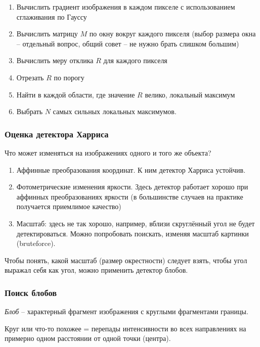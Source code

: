 \documentclass[main.tex]{subfiles}
\begin{document}
\begin{enumerate}[noitemsep]
	\item Вычислить градиент изображения в каждом пикселе с использованием сглаживания по Гауссу
	\item Вычислить матрицу $M$ по окну вокруг каждого пикселя (выбор размера окна -- отдельный вопрос, общий совет -- не нужно брать слишком большим)
	\item Вычислить меру отклика $R$ для каждого пикселя
	\item Отрезать $R$ по порогу
	\item Найти в каждой области, где значение $R$ велико, локальный максимум
	\item Выбрать $ N $ самых сильных локальных максимумов.
\end{enumerate}

\subsubsection{Оценка детектора Харриса}

Что может изменяться на изображениях одного и того же объекта?

\begin{enumerate}[noitemsep]
	\item Аффинные преобразования координат. К ним детектор Харриса устойчив.
	\item Фотометрические изменения яркости. Здесь детектор работает хорошо при аффинных преобразованиях яркости (в большинстве случаев на практике получается приемлимое качество)
	\item Масштаб: здесь не так хорошо, например, вблизи скруглённый угол не будет детектироваться.
	Можно попробовать поискать, изменяя масштаб картинки (bruteforce).
\end{enumerate}

Чтобы понять, какой масштаб (размер окрестности) следует взять, чтобы угол выражал себя как угол, можно применить детектор блобов.

\subsubsection{Поиск блобов}

\emph{Блоб} -- характерный фрагмент изображения с круглыми фрагментами границы.

Круг или что-то похожее = перепады интенсивности во всех направлениях на примерно одном расстоянии от одной точки (центра).
\end{document}
